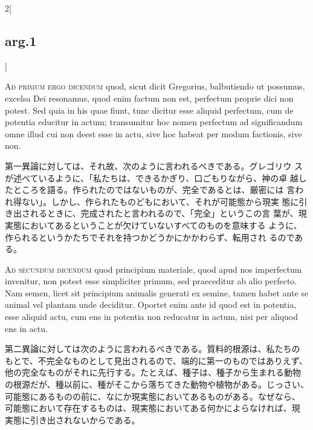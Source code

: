 \documentclass[paper=a4paper,fontsize=10pt,jafontsize=9pt,titlepage]{jlreq}
\begin{document}
\begin{paracol}{2}[\subsection{arg.1}]
\switchcolumn*[\subsection{ad.1}]

{\scshape Ad primum ergo dicendum} quod, sicut dicit Gregorius,
balbutiendo ut possumus, excelsa Dei resonamus, quod enim factum non
est, perfectum proprie dici non potest. Sed quia in his quae fiunt,
tunc dicitur esse aliquid perfectum, cum de potentia educitur in
actum; transumitur hoc nomen perfectum ad significandum omne illud cui
non deest esse in actu, sive hoc habeat per modum factionis, sive non.

\switchcolumn

第一異論に対しては、それ故、次のように言われるべきである。グレゴリウ
スが述べているように、「私たちは、できるかぎり、口ごもりながら、神の卓
越したところを語る。作られたのではないものが、完全であるとは、厳密には
言われ得ない」。しかし、作られたものどもにおいて、それが可能態から現実
態に引き出されるときに、完成されたと言われるので、「完全」というこの言
葉が、現実態においてあるということが欠けていないすべてのものを意味する
ように、作られるというかたちでそれを持つかどうかにかかわらず、転用され
るのである。

\switchcolumn*[\subsection{ad.2}]

{\scshape Ad secundum dicendum} quod principium materiale, quod apud
nos imperfectum invenitur, non potest esse simpliciter primum, sed
praeceditur ab alio perfecto. Nam semen, licet sit principium animalis
generati ex semine, tamen habet ante se animal vel plantam unde
deciditur. Oportet enim ante id quod est in potentia, esse aliquid
actu, cum ens in potentia non reducatur in actum, nisi per aliquod ens
in actu.

\switchcolumn

第二異論に対しては次のように言われるべきである。質料的根源は、私たちの
もとで、不完全なものとして見出されるので、端的に第一のものではありえず、
他の完全なものがそれに先行する。たとえば、種子は、種子から生まれる動物
の根源だが、種以前に、種がそこから落ちてきた動物や植物がある。じっさい、
可能態にあるものの前に、なにか現実態においてあるものがある。なぜなら、
可能態において存在するものは、現実態においてある何かによらなければ、現
実態に引き出されないからである。

\switchcolumn*[\subsection{ad.3}]


\end{paracol}
\end{document}
